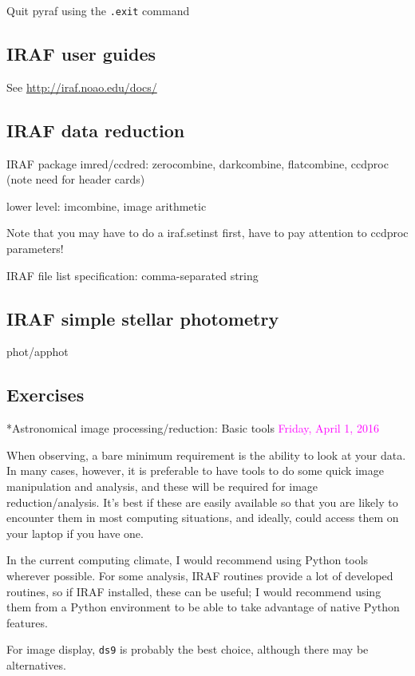 \documentclass{article}
\begin{document}
Quit pyraf using the \verb|.exit| command

\subsection*{IRAF user guides}
See \url{http://iraf.noao.edu/docs/}

\subsection*{IRAF data reduction}
IRAF package imred/ccdred: zerocombine, darkcombine, flatcombine,
ccdproc (note need for header cards)

lower level: imcombine, image arithmetic

Note that you may have to do a iraf.setinst first, have to pay
attention to ccdproc parameters!

IRAF file list specification: comma-separated string

\subsection*{IRAF simple stellar photometry}
phot/apphot

\subsection*{Exercises}

*{Astronomical image processing/reduction: Basic tools}
\textcolor{magenta}{Friday, April 1, 2016}

When observing, a bare minimum requirement is the ability to look at
your data. In many cases, however, it is preferable to have tools to
do some quick image manipulation and analysis, and these will be
required for image reduction/analysis. It's best if these are easily
available so that you are likely to encounter them in most computing
situations, and ideally, could access them on your laptop if you have
one.

In the current computing climate, I would recommend using Python tools
wherever possible. For some analysis, IRAF routines provide a lot of
developed routines, so if IRAF installed, these can be useful; I would
recommend using them from a Python environment to be able to take
advantage of native Python features.

For image display, \texttt{ds9} is probably the best choice, although there may
be alternatives.
\end{document}
